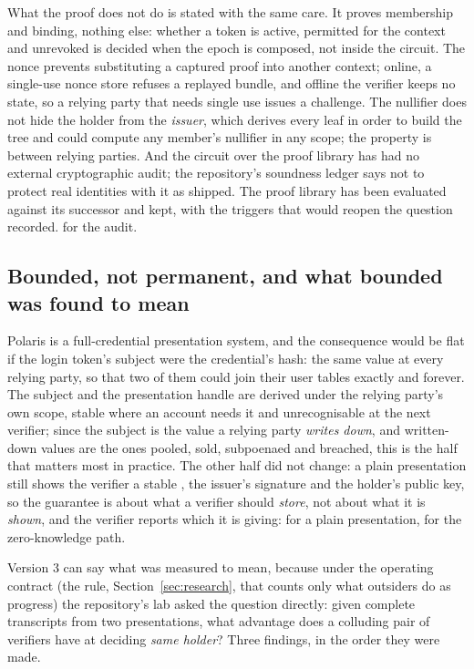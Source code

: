 What the proof does not do is stated with the same care. It proves membership and binding, nothing
else: whether a token is active, permitted for the context and unrevoked is decided when the epoch is
composed, not inside the circuit. The nonce prevents substituting a captured proof into another
context; online, a single-use nonce store refuses a replayed bundle, and offline the verifier keeps no
state, so a relying party that needs single use issues a challenge. The nullifier does not hide the
holder from the \emph{issuer}, which derives every leaf in order to build the tree and could compute
any member's nullifier in any scope; the property is between relying parties. And the circuit over
the proof library has had no external cryptographic audit; the repository's soundness ledger says
not to protect real identities with it as shipped. The proof library has been evaluated against its
successor and kept, with the triggers that would reopen the question recorded.
\sExt{} for the audit.

\subsection{Bounded, not permanent, and what bounded was found to mean}

Polaris is a full-credential presentation system, and the consequence would be flat if the login
token's subject were the credential's hash: the same value at every relying party, so that two of
them could join their user tables exactly and forever. The subject and the presentation handle are
derived under the relying party's own scope, stable where an account needs it and
unrecognisable at the next verifier; since the subject is the value a relying party \emph{writes
down}, and written-down values are the ones pooled, sold, subpoenaed and breached, this is the half
that matters most in practice. The other half did not change: a plain presentation still shows the
verifier a stable , the issuer's signature and the holder's public key, so the
guarantee is about what a verifier should \emph{store}, not about what it is \emph{shown}, and the
verifier reports which it is giving:  for a plain presentation,  for the
zero-knowledge path. \sImpl

Version 3 can say what  was measured to mean, because under the operating contract (the
rule, Section~\ref{sec:research}, that counts only what outsiders do as progress) the repository's lab asked the question directly: given complete transcripts from two presentations,
what advantage does a colluding pair of verifiers have at deciding \emph{same holder}? Three findings,
in the order they were made.

